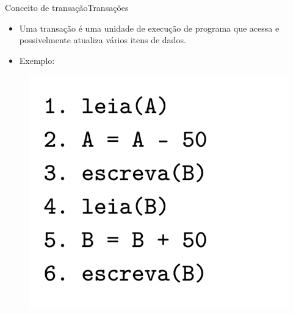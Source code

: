 \documentclass[t]{beamer}
\begin{document}

\begin{ftst}{Conceito de transação}{Transações}

\begin{itemize}
    \item Uma transação é uma unidade de execução de programa que acessa e possivelmente atualiza vários itens de dados.
    \item Exemplo:
\end{itemize}

\begin{figure}
    \centering
    \includegraphics[scale=0.22]{Figuras_transacoes/2.png}
\end{figure}
\end{ftst}

\end{document}

